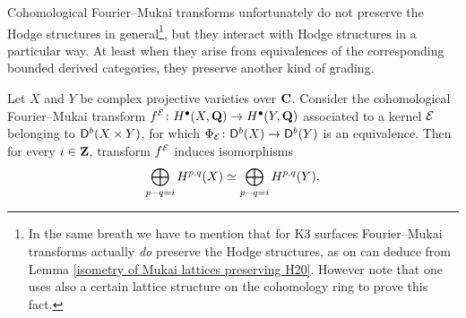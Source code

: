 





Cohomological Fourier--Mukai transforms unfortunately do not preserve the Hodge structures in general\footnote{
    In the same breath we have to mention that for K3 surfaces Fourier--Mukai transforms actually \emph{do} preserve the Hodge structures, as on can deduce from Lemma \ref{isometry of Mukai lattices preserving H20}. However note that one uses also a certain lattice structure on the cohomology ring to prove this fact.
}, but they interact with Hodge structures in a particular way. At least when they arise from equivalences of the corresponding bounded derived categories, they preserve another kind of grading.

\begin{proposition}
    \label{Hodge lattice, fm transform interaction}
    \emph{\cite[\S 5, Proposition 5.39]{huybrechts2006fouriermukai}}
    Let $X$ and $Y$ be complex projective varieties over $\mathbf C$. Consider the cohomological Fourier--Mukai transform $f^{\mathcal E} \colon H^{\bullet}(X, \mathbf Q) \to H^{\bullet}(Y, \mathbf Q)$ associated to a kernel $\mathcal E$ belonging to $\mathsf{D}^b(X \times Y)$, for which $\Phi_{\mathcal E} \colon \mathsf{D}^b(X) \to \mathsf{D}^b(Y)$ is an equivalence.
    Then for every $i \in \mathbf Z$, transform $f^{\mathcal E}$ induces isomorphisms
    \begin{equation*}
        \bigoplus_{p-q = i}H^{p,q}(X) \simeq \bigoplus_{p - q = i} H^{p,q}(Y).
    \end{equation*}
\end{proposition}

